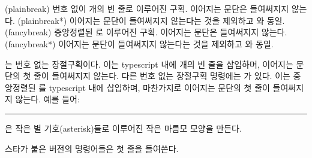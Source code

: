 \begin{syntax}
\cmd{\plainbreak} \cmd{\plainbreak*}  \\
\cmd{\fancybreak} \cmd{\fancybreak*}   \\
\end{syntax}
\glossary(plainbreak)%
  {}%
  {번호 없이  개의 빈 줄로 이루어진 구획. 이어지는 문단은 들여써지지 않는다.
  }
\glossary(plainbreak*)%
  {}%
  {이어지는 문단이 들여써지지 않는다는 것을 제외하고 와 동일.}
\glossary(fancybreak)%
  {}%
  {중앙정렬된 로 이루어진 구획. 이어지는 문단은 들여써지지 않는다.}
\glossary(fancybreak*)%
  {}%
  {이어지는 문단이 들여써지지 않는다는 것을 제외하고 와 동일.}

\cmd{\plainbreak} 는 번호 없는 장절구획이다.
이는 typescript 내에 개의 빈 줄을 삽입하며,
이어지는 문단의 첫 줄이 들여써지지 않는다.
다른 번호 없는 장절구획 명령에는 \cmd{\fancybreak}가 있다.
이는 중앙정렬된 를 typescript 내에 삽입하며,
마찬가지로 이어지는 문단의 첫 줄이 들여써지지 않는다.
예를 들어:

\begin{lcode}
\fancybreak{{*}\\{* * *}\\{*}}
\end{lcode}
은 작은 별 기호(asterisk)들로 이루어진 작은 마름모 모양을 만든다.

스타가 붙은 버전의 명령어들은 첫 줄을 들여쓴다.

